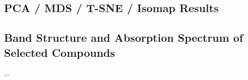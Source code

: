 \documentclass[twoside,twocolumn,9pt]{article}
\begin{document}
\subsection*{PCA / MDS / T-SNE / Isomap Results}

\subsection*{Band Structure and Absorption Spectrum of Selected Compounds}

... \\

\end{document}

